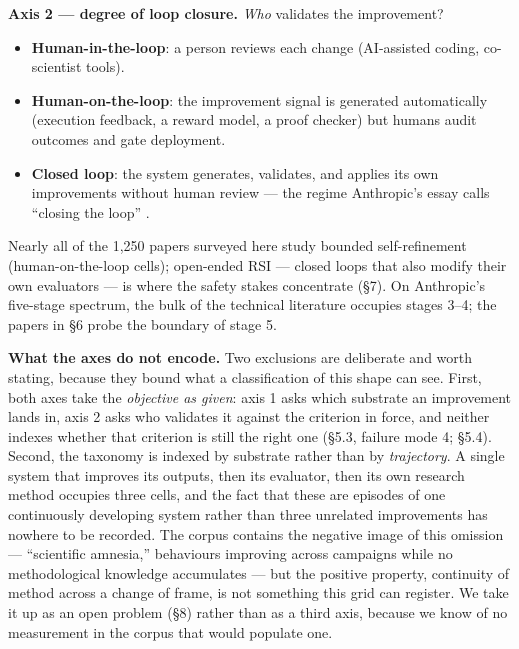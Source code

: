\documentclass[
  11pt,
]{article}
\providecommand{\tightlist}{%
  \setlength{\itemsep}{0pt}\setlength{\parskip}{0pt}}
\begin{document}
\textbf{Axis 2 --- degree of loop closure.} \emph{Who} validates the
improvement?

\begin{itemize}
\tightlist
\item
  \textbf{Human-in-the-loop}: a person reviews each change (AI-assisted
  coding, co-scientist tools).
\item
  \textbf{Human-on-the-loop}: the improvement signal is generated
  automatically (execution feedback, a reward model, a proof checker)
  but humans audit outcomes and gate deployment.
\item
  \textbf{Closed loop}: the system generates, validates, and applies its
  own improvements without human review --- the regime Anthropic's essay
  calls ``closing the loop'' \citep{anthropic2026rsi}.
\end{itemize}

Nearly all of the 1,250 papers surveyed here study bounded
self-refinement (human-on-the-loop cells); open-ended RSI --- closed
loops that also modify their own evaluators --- is where the safety
stakes concentrate (§7). On Anthropic's five-stage spectrum, the bulk of
the technical literature occupies stages 3--4; the papers in §6 probe
the boundary of stage 5.

\textbf{What the axes do not encode.} Two exclusions are deliberate and
worth stating, because they bound what a classification of this shape
can see. First, both axes take the \emph{objective as given}: axis 1
asks which substrate an improvement lands in, axis 2 asks who validates
it against the criterion in force, and neither indexes whether that
criterion is still the right one (§5.3, failure mode 4; §5.4). Second,
the taxonomy is indexed by substrate rather than by \emph{trajectory}. A
single system that improves its outputs, then its evaluator, then its
own research method occupies three cells, and the fact that these are
episodes of one continuously developing system rather than three
unrelated improvements has nowhere to be recorded. The corpus contains
the negative image of this omission --- ``scientific amnesia,''
behaviours improving across campaigns while no methodological knowledge
accumulates \citep{lin2026repeated} --- but the positive property,
continuity of method across a change of frame, is not something this
grid can register. We take it up as an open problem (§8) rather than as
a third axis, because we know of no measurement in the corpus that would
populate one.
\end{document}
